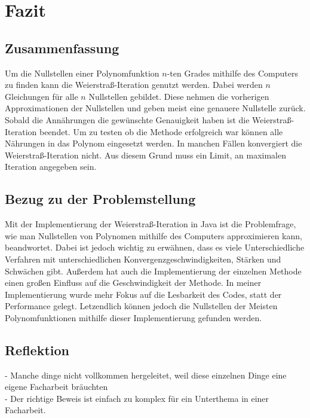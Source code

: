 \documentclass[12pt]{article}
\begin{document}

\section{Fazit}
\subsection{Zusammenfassung}
Um die Nullstellen einer Polynomfunktion $n$-ten Grades mithilfe des Computers zu finden kann die Weierstraß-Iteration genutzt werden. Dabei werden $n$ Gleichungen für alle $n$ Nullstellen gebildet. Diese nehmen die vorherigen Approximationen der Nullstellen und geben meist eine genauere Nullstelle zurück. Sobald die Annährungen die gewünschte Genauigkeit haben ist die Weierstraß-Iteration beendet. Um zu testen ob die Methode erfolgreich war können alle Nährungen in das Polynom eingesetzt werden. In manchen Fällen konvergiert die Weierstraß-Iteration nicht. Aus diesem Grund muss ein Limit, an maximalen Iteration angegeben sein.

\subsection{Bezug zu der Problemstellung}
Mit der Implementierung der Weierstraß-Iteration in Java ist die Problemfrage, wie man Nullstellen von Polynomen mithilfe des Computers approximieren kann, beandwortet. Dabei ist jedoch wichtig zu erwähnen, dass es viele Unterschiedliche Verfahren mit unterschiedlichen Konvergenzgeschwindigkeiten, Stärken und Schwächen gibt. Außerdem hat auch die Implementierung der einzelnen Methode einen großen Einfluss auf die Geschwindigkeit der Methode. In meiner Implementierung wurde mehr Fokus auf die Lesbarkeit des Codes, statt der Performance gelegt. Letzendlich können jedoch die Nullstellen der Meisten Polynomfunktionen mithilfe dieser Implementierung gefunden werden.

\subsection{Reflektion}
- Manche dinge nicht vollkommen hergeleitet, weil diese einzelnen Dinge eine eigene Facharbeit bräuchten\\
- Der richtige Beweis ist einfach zu komplex für ein Unterthema in einer Facharbeit.
\end{document}
